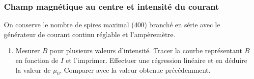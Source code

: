 \documentclass[a4paper, 11pt, final, garamond]{book}
\begin{document}
\subsubsection{Champ magnétique au centre et intensité du courant}
\label{sssec:solint}
On conserve le nombre de spires maximal (\num{400}) branché en série avec le
générateur de courant continu réglable et l'ampèremètre.
\begin{enumerate}
  \item Mesurer $B$ pour plusieurs valeurs d'intensité.
  \sqitem[5] Tracer la courbe représentant $B$ en fonction de $I$ et l'imprimer.
  \sqitem[6] Effectuer une régression linéaire et en déduire la valeur de
  $\mu_0$. Comparer avec la valeur obtenue précédemment.
\end{enumerate}
\end{document}
